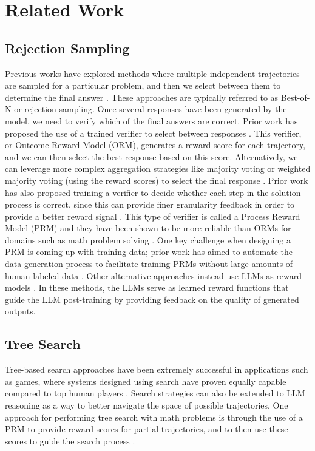 \section{Related Work}
\subsection{Rejection Sampling}
Previous works have explored methods where multiple independent trajectories are sampled for a particular problem, and then we select between them to determine the final answer \cite{wang2022self, chen2024more,beeching2024scalingtesttimecompute, brown2024large}.
These approaches are typically referred to as Best-of-N or rejection sampling. 
Once several responses have been generated by the model, we need to verify which of the final answers are correct.  
Prior work has proposed the use of a trained verifier to select between responses \cite{cobbe2021training}.
This verifier, or Outcome Reward Model (ORM), generates a reward score for each trajectory, and we can then select the best response based on this score.
Alternatively, we can leverage more complex aggregation strategies like majority voting or weighted majority voting (using the reward scores) to select the final response \cite{wang2022self, chen2024more,beeching2024scalingtesttimecompute}.
Prior work has also proposed training a verifier to decide whether each step in the solution process is correct, since this can provide finer granularity feedback in order to provide a better reward signal \cite{uesato2022solving}. 
This type of verifier is called a Process Reward Model (PRM) and they have been shown to be more reliable than ORMs for domains such as math problem solving \cite{lightman2023let}.
One key challenge when designing a PRM is coming up with training data; prior work has aimed to automate the data generation process to facilitate training PRMs without large amounts of human labeled data \cite{wang2024math}.
Other alternative approaches instead use LLMs as reward models \cite{bai2022constitutional,abdulhai2023lmrl,lee2024rlaif,pan2024autonomous}. In these methods, the LLMs serve as learned reward functions that guide the LLM post-training by providing feedback on the quality of generated outputs.

\subsection{Tree Search}

Tree-based search approaches have been extremely successful in applications such as games, where systems designed using search have proven equally capable compared to top human players \cite{brown2017libratus, silver2016mastering, silver2017mastering}.
Search strategies can also be extended to LLM reasoning as a way to better navigate the space of possible trajectories.
One approach for performing tree search with math problems is through the use of a PRM to  provide reward scores for partial trajectories, and to then use these scores to guide the search process \cite{yao2024tree,zhou2023language,besta2024graph, snell2024scaling}.

